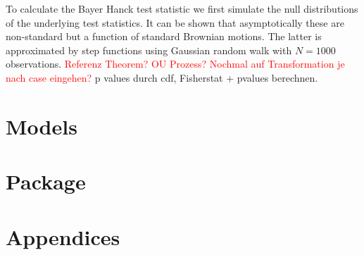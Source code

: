 \documentclass[12pt,a4paper]{article}
\begin{document}
To calculate the Bayer Hanck test statistic we first simulate the null
distributions of the underlying test statistics. It can be shown that
asymptotically these are non-standard but a function of standard
Brownian motions. The latter is approximated by step functions using
Gaussian random walk with \(N = 1000\) observations.
\textcolor{red}{Referenz Theorem? OU Prozess? Nochmal auf Transformation je nach case eingehen?}
p values durch cdf, Fisherstat + pvalues berechnen.

\hypertarget{models}{%
\section{Models}\label{models}}

\hypertarget{package}{%
\section{Package}\label{package}}

\pagebreak


\printbibliography[title = References]
\cleardoublepage

\begin{refsection}
\nocite{R-base}
\nocite{R-stargazer}
\nocite{R-stringr}
\nocite{R-tidyr}
\nocite{R-dplyr}
\nocite{R-glmnet}
\nocite{R-class}
\nocite{R-MASS}
\nocite{R-plm}
\nocite{R-leaps}
\nocite{R-caret}
\nocite{R-tree}
\nocite{R-gbm}
\nocite{R-plotmo}
\nocite{R-pls}
\nocite{R-splines}
\nocite{R-tictoc}
\nocite{R-plotly}
\nocite{R-inspectdf}
\nocite{R-rpart}
\nocite{R-rpart.plot}
\nocite{R-stargazer}
\nocite{R-knitr}
\nocite{R-purrr}
\nocite{R-randomForest}
\nocite{R-rstudioapi}





\nocite{R-Studio}

\printbibliography[title = Software-References]
\end{refsection}

\cleardoublepage
\appendix
\setcounter{table}{0}
\setcounter{figure}{0}
\renewcommand{\thetable}{A\arabic{table}}
\renewcommand{\thefigure}{A\arabic{figure}}


\hypertarget{appendices}{%
\section{Appendices}\label{appendices}}
\end{document}
